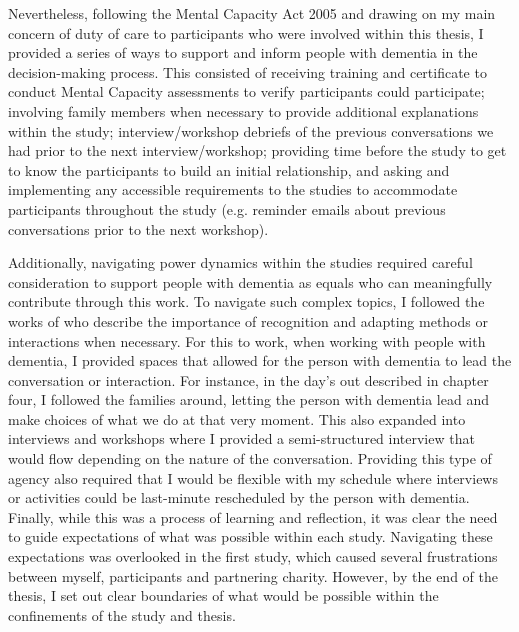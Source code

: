 Nevertheless, following the Mental Capacity Act 2005 \citep{oyebode_mental_2005} and drawing on my main concern of duty of care to participants who were involved within this thesis, I provided a series of ways to support and inform people with dementia in the decision-making process. This consisted of receiving training and certificate to conduct Mental Capacity assessments to verify participants could participate; involving family members when necessary to provide additional explanations within the study; interview/workshop debriefs of the previous conversations we had prior to the next interview/workshop; providing time before the study to get to know the participants to build an initial relationship, and asking and implementing any accessible requirements to the studies to accommodate participants throughout the study (e.g. reminder emails about previous conversations prior to the next workshop). 

Additionally, navigating power dynamics within the studies required careful consideration to support people with dementia as equals who can meaningfully contribute through this work. To navigate such complex topics, I followed the works of \cite{foley_struggle_2019,morrissey_value_2017, lazar_critical_2017} who describe the importance of recognition and adapting methods or interactions when necessary. For this to work, when working with people with dementia, I provided spaces that allowed for the person with dementia to lead the conversation or interaction. For instance, in the day's out described in chapter four, I followed the families around, letting the person with dementia lead and make choices of what we do at that very moment. This also expanded into interviews and workshops where I provided a semi-structured interview that would flow depending on the nature of the conversation. Providing this type of agency also required that I would be flexible with my schedule where interviews or activities could be last-minute rescheduled by the person with dementia. Finally, while this was a process of learning and reflection, it was clear the need to guide expectations of what was possible within each study. Navigating these expectations was overlooked in the first study, which caused several frustrations between myself, participants and partnering charity. However, by the end of the thesis, I set out clear boundaries of what would be possible within the confinements of the study and thesis.


